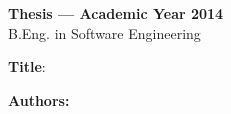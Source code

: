 \thispagestyle{empty}

\begin{flushleft}
\textbf{Thesis --- Academic Year 2014} \\
B.Eng. in Software Engineering \kmitl


\textbf{Title}: 

\textbf{Authors:}

\end{flushleft}